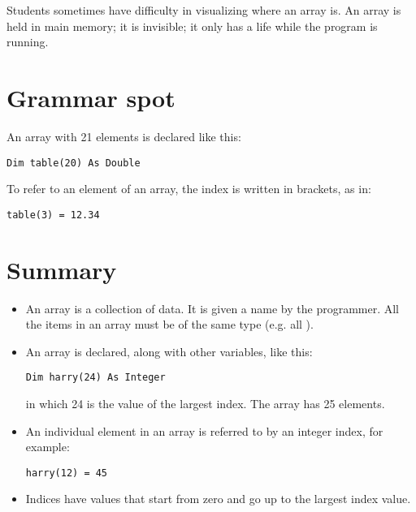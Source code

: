 		Students sometimes have difficulty in visualizing where an array is. An array is held in main memory; it is invisible; it only has a life while the program is running.


	\section{Grammar spot}
		An array with 21 elements is declared like this:
		\begin{lstlisting}
Dim table(20) As Double
		\end{lstlisting}
		To refer to an element of an array, the index is written in brackets, as in:
		\begin{lstlisting}
table(3) = 12.34
		\end{lstlisting}


	\section{Summary}
		\begin{itemize}
      \item An array is a collection of data. It is given a name by the programmer. All the items in an array must be of the same type (e.g. all ).
      \item An array is declared, along with other variables, like this:
				\begin{lstlisting}
Dim harry(24) As Integer
				\end{lstlisting}
				in which 24 is the value of the largest index. The array has 25 elements.
      \item An individual element in an array is referred to by an integer index, for example:
				\begin{lstlisting}
harry(12) = 45
				\end{lstlisting}
      \item Indices have values that start from zero and go up to the largest index value.
		\end{itemize}


